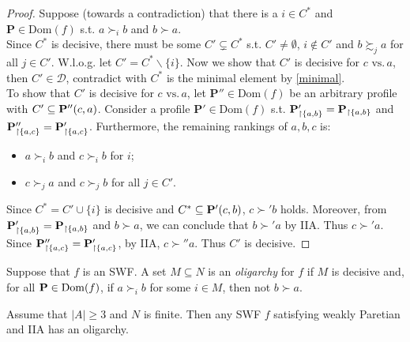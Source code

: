 \begin{proof}
    Suppose (towards a contradiction) that there is a $i \in C^\ast$ and $\mathbf{P} \in \mathrm{Dom}(f)$ s.t. $a \succ_i b$ and $b \succ a$.\\
    Since $C^\ast$ is decisive, there must be some $C' \subsetneq C^\ast$ s.t. $C' \neq \emptyset$, $i \not \in C'$ and $b \succsim_j a$ for all $j \in C'$. W.l.o.g. let $C' = C^\ast \backslash \{i\}$. Now we show that $C'$ is decisive for $c \mbox{ vs.}\, a$, then $C' \in \mathcal{D}$, contradict with $C^\ast$ is the minimal element by \cref{minimal}.\\
    To show that $C'$ is decisive for $c \mbox{ vs.}\, a$, let $\mathbf{P''} \in \mathrm{Dom}(f)$ be an arbitrary profile with $C' \subseteq \mathbf{P}''(c,a)$. Consider a profile $\mathbf{P'} \in \mathrm{Dom}(f)$ s.t. $\mathbf{P}'_{\upharpoonright \{a,b\}} = \mathbf{P}_{\upharpoonright \{a,b\}}$ and $\mathbf{P}''_{\upharpoonright \{a,c\}} = \mathbf{P}'_{\upharpoonright \{a,c\}}$. Furthermore, the remaining rankings of $a,b,c$ is:
    \begin{itemize}
        \item $a \succ_i b$ and $c \succ_i b$ for $i$;
        \item $c \succ_j a$ and $c \succ_j b$ for all $j \in C'$.
    \end{itemize}
    Since $C^\ast = C' \cup \{i\}$ is decisive and $C^\ast \subseteq \mathbf{P}'(c,b)$, $c \succ' b$ holds. Moreover, from $\mathbf{P}'_{\upharpoonright \{a,b\}} = \mathbf{P}_{\upharpoonright \{a,b\}}$ and $b \succ a$, we can conclude that $b \succ' a$ by IIA. Thus $c \succ' a$.\\
    Since $\mathbf{P}''_{\upharpoonright \{a,c\}} = \mathbf{P}'_{\upharpoonright \{a,c\}}$, by IIA, $c \succ'' a$. Thus $C'$ is decisive.
\end{proof}

\begin{definition}[Oligarchy]
    Suppose that $f$ is an SWF. A set $M \subseteq N$ is an \textit{oligarchy} for $f$ if $M$ is decisive and, for all $\mathbf{P} \in \mathrm{Dom}(f)$, if $a \succ_i b$ for some $i \in M$, then not $b \succ a$.
\end{definition}

\begin{theorem}
    \label{oligarchy}
    Assume that $|A| \geq 3$ and $N$ is finite. Then any SWF $f$ satisfying weakly Paretian and IIA has an oligarchy.
\end{theorem}

